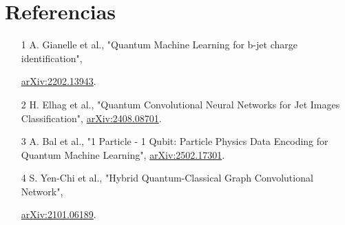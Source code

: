 \documentclass[12pt,a4paper]{article}
\begin{document}
\section{Referencias}
\begin{itemize}
    \item [1] A. Gianelle et al., "Quantum Machine Learning for b-jet charge identification", 
    
    \href{https://arxiv.org/pdf/2202.13943}{arXiv:2202.13943}.
    
    \item [2] H. Elhag et al., "Quantum Convolutional Neural Networks for Jet Images Classification", \href{https://arxiv.org/pdf/2408.08701}{arXiv:2408.08701}.
    \item [3] A. Bal et al., "1 Particle - 1 Qubit: Particle Physics Data Encoding for Quantum Machine Learning", \href{https://arxiv.org/pdf/2502.17301}{arXiv:2502.17301}.
    \item [4] S. Yen-Chi et al., "Hybrid Quantum-Classical Graph Convolutional Network", 
    
    \href{https://arxiv.org/pdf/2101.06189}{arXiv:2101.06189}.
\end{itemize}

\end{document}
